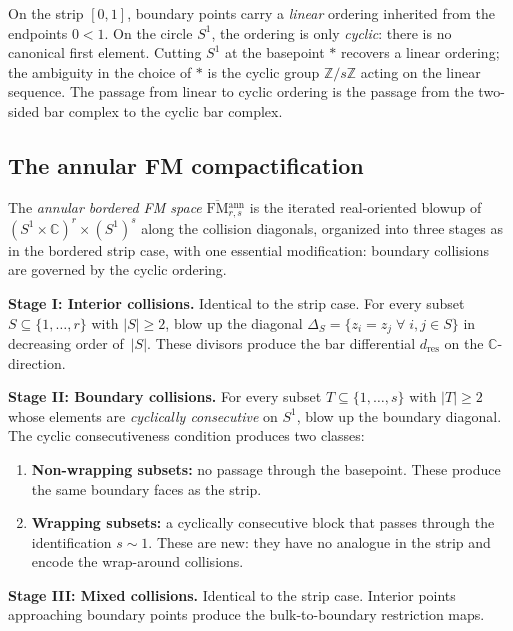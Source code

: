 \documentclass[11pt]{article}
\newcommand{\C}{\mathbb{C}}
\newcommand{\Z}{\mathbb{Z}}
\newcommand{\FM}{\mathrm{FM}}
\begin{document}
\begin{remark}
\label{rem:cyclic-vs-linear-wn}
On the strip $[0,1]$, boundary points carry a \emph{linear}
ordering inherited from the endpoints $0<1$.  On the circle $S^1$,
the ordering is only \emph{cyclic}: there is no canonical
first element.  Cutting $S^1$ at the basepoint $*$ recovers
a linear ordering; the ambiguity in the choice of $*$ is the
cyclic group $\Z/s\Z$ acting on the linear sequence.  The
passage from linear to cyclic ordering is the passage from the
two-sided bar complex to the cyclic bar complex.
\end{remark}

\subsection{The annular FM compactification}
\label{subsec:annular-FM-compact-wn}

\begin{definition}
\label{def:annular-FM-wn}
The \emph{annular bordered FM space}
$\overline{\FM}{}^{\mathrm{ann}}_{r,s}$ is the
iterated real-oriented blowup of
$(S^1\times\C)^r\times(S^1)^s$ along the collision diagonals,
organized into three stages as in the bordered strip case,
with one essential modification:
boundary collisions are governed by the cyclic ordering.

\medskip
\noindent\textbf{Stage I: Interior collisions.}
Identical to the strip case.  For every subset
$S\subseteq\{1,\dotsc,r\}$ with $|S|\ge 2$, blow up the diagonal
$\Delta_S=\{z_i=z_j\;\forall\;i,j\in S\}$ in decreasing order
of~$|S|$.  These divisors produce the bar differential
$d_{\mathrm{res}}$ on the $\C$-direction.

\medskip
\noindent\textbf{Stage II: Boundary collisions.}
For every subset $T\subseteq\{1,\dotsc,s\}$ with $|T|\ge 2$
whose elements are \emph{cyclically consecutive} on $S^1$, blow
up the boundary diagonal.
The cyclic consecutiveness condition produces two classes:
\begin{enumerate}[label=(\roman*)]
\item \textbf{Non-wrapping subsets:} no passage through the basepoint.
These produce the same boundary faces as the strip.
\item \textbf{Wrapping subsets:} a cyclically
consecutive block that passes through the identification
$s\sim 1$.  These are new: they have no analogue in the
strip and encode the wrap-around collisions.
\end{enumerate}

\medskip
\noindent\textbf{Stage III: Mixed collisions.}
Identical to the strip case.  Interior points approaching
boundary points produce the bulk-to-boundary restriction maps.
\end{definition}
\end{document}
